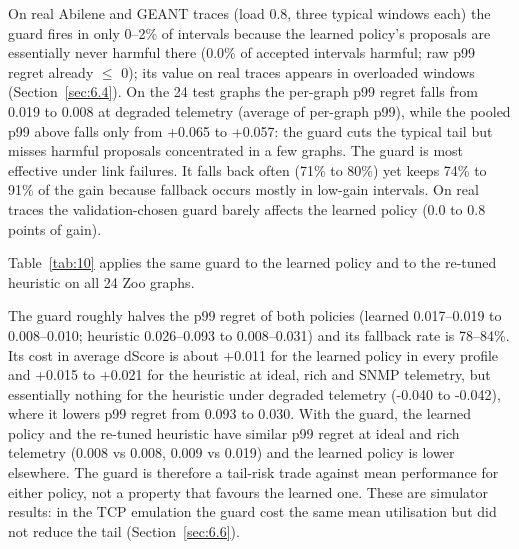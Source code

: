 \documentclass[journal]{IEEEtran}
\begin{document}
On real Abilene and GEANT traces (load 0.8, three typical windows each) the guard fires in only 0--2\% of intervals because the learned policy's proposals are essentially never harmful there (0.0\% of accepted intervals harmful; raw p99 regret already $\le$ 0); its value on real traces appears in overloaded windows (Section~\ref{sec:6.4}). On the 24 test graphs the per-graph p99 regret falls from 0.019 to 0.008 at degraded telemetry (average of per-graph p99), while the pooled p99 above falls only from +0.065 to +0.057: the guard cuts the typical tail but misses harmful proposals concentrated in a few graphs. The guard is most effective under link failures. It falls back often (71\% to 80\%) yet keeps 74\% to 91\% of the gain because fallback occurs mostly in low-gain intervals. On real traces the validation-chosen guard barely affects the learned policy (0.0 to 0.8 points of gain).

Table~\ref{tab:10} applies the same guard to the learned policy and to the re-tuned heuristic on all 24 Zoo graphs.

\begin{table}[!t]
\caption{Guard applied to the learned policy and to the re-tuned heuristic (24 Zoo graphs, layer 2 only, eps = -0.06). Each cell gives mean dScore and mean per-graph p99 regret.}
\label{tab:10}
\centering
\scriptsize
\renewcommand{\arraystretch}{1.05}
\end{table}

The guard roughly halves the p99 regret of both policies (learned 0.017--0.019 to 0.008--0.010; heuristic 0.026--0.093 to 0.008--0.031) and its fallback rate is 78--84\%. Its cost in average dScore is about +0.011 for the learned policy in every profile and +0.015 to +0.021 for the heuristic at ideal, rich and SNMP telemetry, but essentially nothing for the heuristic under degraded telemetry (-0.040 to -0.042), where it lowers p99 regret from 0.093 to 0.030. With the guard, the learned policy and the re-tuned heuristic have similar p99 regret at ideal and rich telemetry (0.008 vs 0.008, 0.009 vs 0.019) and the learned policy is lower elsewhere. The guard is therefore a tail-risk trade against mean performance for either policy, not a property that favours the learned one. These are simulator results: in the TCP emulation the guard cost the same mean utilisation but did not reduce the tail (Section~\ref{sec:6.6}).
\end{document}
